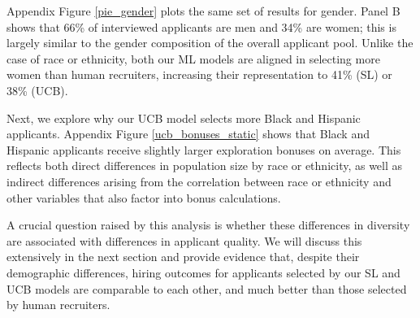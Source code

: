 \documentclass[crop,noquery,editorname,historyrev,nosurname,runningno,sepcount]{RESTUD}
\begin{document}
Appendix Figure \ref{pie_gender} plots the same set of results for gender.  Panel B shows that 66\% of interviewed applicants are men and 34\% are women; this is largely similar to the gender composition of the overall applicant pool.  Unlike the case of race or ethnicity, both our ML models are aligned in selecting more women than human recruiters, increasing their representation to 41\% (SL) or 38\% (UCB).  

Next, we explore why our UCB model selects more Black and Hispanic applicants.  Appendix Figure \ref{ucb_bonuses_static} shows that Black and Hispanic applicants receive slightly larger exploration bonuses on average. This reflects both direct differences in population size by race or ethnicity, as well as indirect differences arising from the correlation between race or ethnicity and other variables that also factor into bonus calculations.  


A crucial question raised by this analysis is whether these differences in diversity are associated with differences in applicant quality.  We will discuss this extensively in the next section and provide evidence that, despite their demographic differences, hiring outcomes for applicants selected by our SL and UCB models are comparable to each other, and much better than those selected by human recruiters.  
\end{document}
